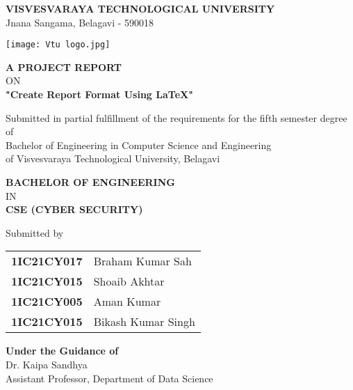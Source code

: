 \documentclass[12pt, a4paper]{report}
\begin{document}
\begin{titlepage}
\thispagestyle{empty}
\begin{center}

\textbf{{\large VISVESVARAYA TECHNOLOGICAL UNIVERSITY}}\\
{\normalsize Jnana Sangama, Belagavi - 590018}\\
\vspace{0.3in}

\texttt{[image: Vtu logo.jpg]}\\
\vspace{0.3in}

\textbf{A PROJECT REPORT}\\
ON\\
\vspace{0.2in}
\textbf{{\large "Create Report Format Using \LaTeX"}}\\
\vspace{0.2in}

{\small Submitted in partial fulfillment of the requirements for the fifth semester degree of\\
Bachelor of Engineering in Computer Science and Engineering\\
of Visvesvaraya Technological University, Belagavi}\\
\vspace{0.2in}

\textbf{BACHELOR OF ENGINEERING}\\
IN\\
\textbf{CSE (CYBER SECURITY)}\\
\vspace{0.3in}

Submitted by\\
\vspace{0.1in}
\begin{tabular}{rl}
\textbf{1IC21CY017} & Braham Kumar Sah \\
\textbf{1IC21CY015} & Shoaib Akhtar \\
\textbf{1IC21CY005} & Aman Kumar \\
\textbf{1IC21CY015} & Bikash Kumar Singh \\
\end{tabular}
\vspace{0.3in}

\textbf{Under the Guidance of}\\
Dr. Kaipa Sandhya\\
Assistant Professor, Department of Data Science\\
\vspace{0.3in}


\end{center}
\end{titlepage}
\end{document}
